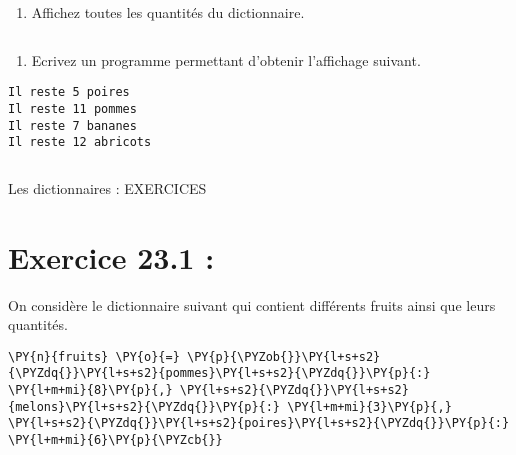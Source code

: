 \documentclass[12pt]{book}
\begin{document}
    \begin{enumerate}
\def\labelenumi{\arabic{enumi}.}
\setcounter{enumi}{1}
\tightlist
\item
  Affichez toutes les quantités du dictionnaire.
\end{enumerate}

    \begin{tcolorbox}[breakable, size=fbox, boxrule=1pt, pad at break*=1mm,colback=cellbackground, colframe=cellborder]
\begin{Verbatim}[commandchars=\\\{\}]

\end{Verbatim}
\end{tcolorbox}

    \begin{enumerate}
\def\labelenumi{\arabic{enumi}.}
\setcounter{enumi}{2}
\tightlist
\item
  Ecrivez un programme permettant d'obtenir l'affichage suivant.
\end{enumerate}

\begin{verbatim}
Il reste 5 poires
Il reste 11 pommes
Il reste 7 bananes
Il reste 12 abricots
\end{verbatim}

    \begin{tcolorbox}[breakable, size=fbox, boxrule=1pt, pad at break*=1mm,colback=cellbackground, colframe=cellborder]
\begin{Verbatim}[commandchars=\\\{\}]

\end{Verbatim}
\end{tcolorbox}

    Les dictionnaires : EXERCICES

    \hypertarget{exercice-23.1}{%
\section{Exercice 23.1 :}\label{exercice-23.1}}

On considère le dictionnaire suivant qui contient différents fruits
ainsi que leurs quantités.

    \begin{tcolorbox}[breakable, size=fbox, boxrule=1pt, pad at break*=1mm,colback=cellbackground, colframe=cellborder]
\begin{Verbatim}[commandchars=\\\{\}]
\PY{n}{fruits} \PY{o}{=} \PY{p}{\PYZob{}}\PY{l+s+s2}{\PYZdq{}}\PY{l+s+s2}{pommes}\PY{l+s+s2}{\PYZdq{}}\PY{p}{:} \PY{l+m+mi}{8}\PY{p}{,} \PY{l+s+s2}{\PYZdq{}}\PY{l+s+s2}{melons}\PY{l+s+s2}{\PYZdq{}}\PY{p}{:} \PY{l+m+mi}{3}\PY{p}{,} \PY{l+s+s2}{\PYZdq{}}\PY{l+s+s2}{poires}\PY{l+s+s2}{\PYZdq{}}\PY{p}{:} \PY{l+m+mi}{6}\PY{p}{\PYZcb{}}
\end{Verbatim}
\end{tcolorbox}
\end{document}
